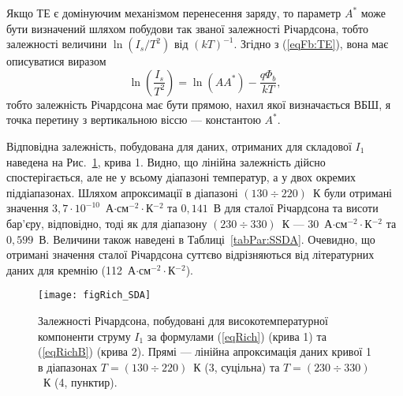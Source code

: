 Якщо ТЕ є домінуючим механізмом перенесення заряду, то параметр $A^*$ може бути
визначений \cite{Rhoderick1988,Schroder2006} шляхом побудови так званої залежності Річардсона,
тобто залежності величини $\ln(I_s/T^2)$ від $(kT)^{-1}$.
Згідно з (\ref{eqFb:TE}), вона має описуватися виразом
\begin{equation}\label{eqRich}
\ln\left(\frac{I_s}{T^2}\right)=\ln(AA^*)-\frac{q\Phi_b}{kT},
\end{equation}
тобто залежність Річардсона має бути прямою, нахил якої визначається ВБШ,
я точка перетину з вертикальною віссю --- константою $A^*$.


Відповідна залежність, побудована для даних, отриманих для складової $I_1$ наведена
на Рис.~\ref{figRich_SDA}, крива 1.
Видно, що лінійна залежність дійсно спостерігається, але не у всьому діапазоні температур, а у двох окремих піддіапазонах.
Шляхом апроксимації в діапазоні $(130\div220)$~К були отримані значення $3,7\cdot10^{-10}$~А$\cdot$см$^{-2}\cdot$К$^{-2}$ та
$0,141$~В для сталої Річардсона та висоти бар'єру, відповідно,
тоді як для діапазону $(230\div330)$~К ---
$30$~А$\cdot$см$^{-2}\cdot$К$^{-2}$ та $0,599$~В.
Величини також наведені в Таблиці~\ref{tabPar:SSDA}.
Очевидно, що отримані значення сталої Річардсона суттєво відрізняються від літературних даних
для кремнію (112~А$\cdot$см$^{-2}\cdot$К$^{-2}$).


\begin{figure}
\center
\texttt{[image: figRich\_SDA]}
\caption{\label{figRich_SDA}
Залежності Річардсона, побудовані для високотемпературної компоненти струму $I_1$
за формулами (\ref{eqRich}) (крива 1) та (\ref{eqRichB}) (крива 2).
Прямі --- лінійна апроксимація даних кривої 1 в діапазонах $T=(130\div220)$~К (3, суцільна)
та $T=(230\div330)$~К (4, пунктир).
}%
\end{figure}



